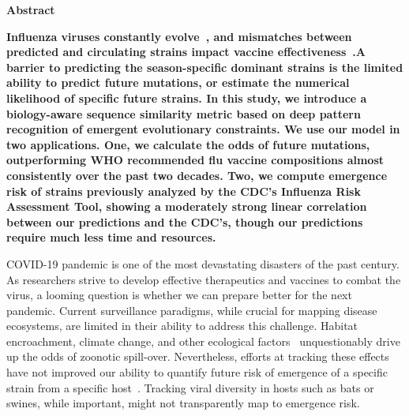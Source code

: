 \documentclass[onecolumn, compsoc,10pt]{IEEEtran}
\begin{document}
 
 
\maketitle

 



\begin{center}
    \textbf{Abstract}
\end{center}

{\color{MediumBlue}
    {\bf \sffamily \fontsize{10}{12}\selectfont \noindent
    Influenza viruses constantly evolve~\cite{dos2016influenza}, and mismatches between predicted and circulating strains impact vaccine effectiveness~\cite{tricco2013comparing}.A barrier to predicting the season-specific dominant strains is the limited ability to predict future mutations, or estimate the numerical likelihood of specific future strains. In this study, we introduce a biology-aware sequence similarity metric based on deep pattern recognition of emergent evolutionary constraints. We use our model in two applications. One, we calculate the odds of future mutations, outperforming WHO recommended flu vaccine compositions almost consistently over the past two decades. Two, we compute emergence risk of strains previously analyzed by the CDC's Influenza Risk Assessment Tool, showing a moderately strong linear correlation between our predictions and the CDC's, though our predictions require much less time and resources.}
}





\vspace{10pt}
  
 COVID-19 pandemic is one of the most devastating disasters of the past century. As researchers strive to develop effective therapeutics and vaccines to combat the \hcov virus, a looming question is whether we can prepare better for the next pandemic. Current surveillance paradigms, while crucial for mapping disease ecosystems, are limited in their ability to address this challenge. Habitat encroachment, climate change, and other ecological factors~\cite{rulli2017nexus,chua2002anthropogenic,childs2004zoonotic} unquestionably drive up the odds of zoonotic spill-over. Nevertheless, efforts at tracking these effects have not improved our ability to quantify future risk of emergence of a specific strain from a specific host~\cite{fair2019viral}. Tracking viral diversity in hosts such as bats or swines, while important, might not transparently map to emergence risk.
\end{document}
